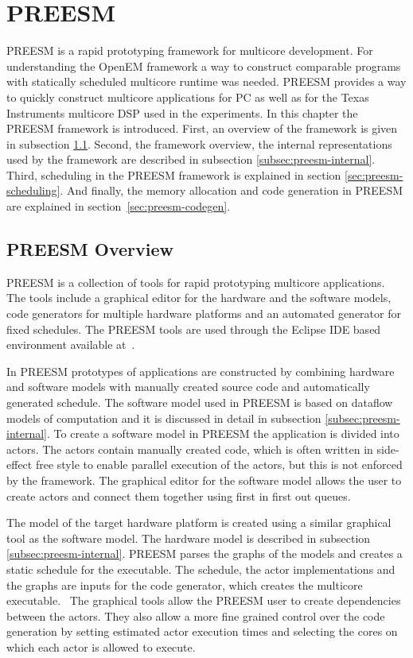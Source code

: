 \section{PREESM}
\label{sec:preesm}
PREESM is a rapid prototyping framework for multicore development. For understanding the OpenEM framework a way to construct comparable programs with statically scheduled multicore runtime was needed. PREESM provides a way to quickly construct multicore applications for PC as well as for the Texas Instruments multicore DSP used in the experiments. In this chapter the PREESM framework is introduced. First, an overview of the framework is given in subsection \ref{subsec:preesm-overview}. Second, the framework overview, the internal representations used by the framework are described in subsection \ref{subsec:preesm-internal}. Third, scheduling in the PREESM framework is explained in section \ref{sec:preesm-scheduling}. And finally, the memory allocation and code generation in PREESM are explained in section~\ref{sec:preesm-codegen}.

\subsection{PREESM Overview}
\label{subsec:preesm-overview}
PREESM is a collection of tools for rapid prototyping multicore applications. The tools include a graphical editor for the hardware and the software models, code generators for multiple hardware platforms and an automated generator for fixed schedules. The PREESM tools are used through the Eclipse IDE based environment available at~\cite{preesm}.

In PREESM prototypes of applications are constructed by combining hardware and software models with manually created source code and automatically generated schedule. The software model used in PREESM is based on dataflow models of computation and it is discussed in detail in subsection \ref{subsec:preesm-internal}. To create a software model in PREESM the application is divided into actors. The actors contain manually created code, which is often written in side-effect free style to enable parallel execution of the actors, but this is not enforced by the framework. The graphical editor for the software model allows the user to create actors and connect them together using first in first out queues.~\cite{preesm}

The model of the target hardware platform is created using a similar graphical tool as the software model. The hardware model is described in subsection \ref{subsec:preesm-internal}. PREESM parses the graphs of the models and creates a static schedule for the executable. The schedule, the actor implementations and the graphs are inputs for the code generator, which creates the multicore executable.~\cite{pelcat2014preesm} The graphical tools allow the PREESM user to create dependencies between the actors. They also allow a more fine grained control over the code generation by setting estimated actor execution times and selecting the cores on which each actor is allowed to execute.

